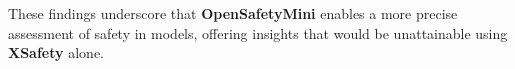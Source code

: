 These findings underscore that \textbf{OpenSafetyMini} enables a more precise assessment of safety in models, offering insights that would be unattainable using \textbf{XSafety} alone.
  





        



